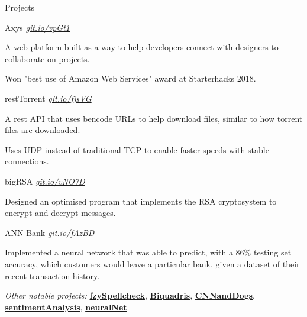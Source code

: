 \documentclass{resume} %
\begin{document}
\begin{rSection}{Projects}
  
  \begin{rSubsection}{Axys}
	  {\em {\href{https://github.com/MSJawad/AXYS}
		    {git.io/vpGt1}}}
	  {}

    \item A web platform built as a way to help developers connect with designers to collaborate on projects.
    \item Won "best use of Amazon Web Services" award at Starterhacks 2018.
      
  \end{rSubsection}

	\begin{rSubsection}{restTorrent}
		{\em {\href{https://github.com/MSJawad/restTorrent}
				{git.io/fjsVG}}}
		{}
		
		\item A rest API that uses bencode URLs to help download files, similar to how torrent files are downloaded.
		\item Uses UDP instead of traditional TCP to enable faster speeds with stable connections.
		
	\end{rSubsection}

  \begin{rSubsection}{bigRSA}
	  {\em {\href{https://github.com/MSJawad/bigRSA}
		    {git.io/vNO7D}}}
	  {}

    \item Designed an optimised program that implements the RSA cryptosystem to encrypt and decrypt messages.
    
    \end{rSubsection}
    
   \begin{rSubsection}{ANN-Bank}
	  {\em {\href{https://github.com/MSJawad/ANN-Bank-Solutions}
		    {git.io/fAzBD}}}
	  {}

    \item Implemented a neural network that was able to predict, with a 86\% testing set accuracy, which customers would leave a particular bank, given a dataset of their recent transaction history.
   
    
  \end{rSubsection}

  \begin{rMinisection}
    \item {\em Other notable projects:}
      \href{https://github.com/MSJawad/Fuzzy-Spellcheck}{\textbf{fzySpellcheck}},
      \href{https://github.com/MiltonIp/Biquadris}{\textbf{Biquadris}},
      \href{https://github.com/MSJawad/CNNandDogs}{\textbf{CNNandDogs}},      
      \href{https://github.com/MSJawad/sentimentAnalysis}{\textbf{sentimentAnalysis}},
      \href{https://github.com/MSJawad/Neural-Network}{\textbf{neuralNet}}
  \end{rMinisection}
\end{rSection}
\end{document}
